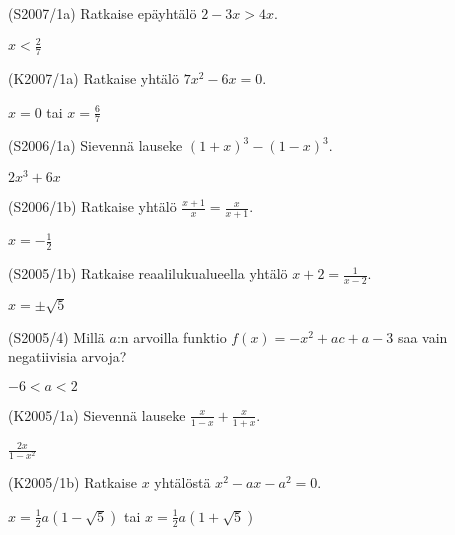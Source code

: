 \begin{tehtava}
(S2007/1a) Ratkaise epäyhtälö $2-3x>4x$.
\begin{vastaus}
$x< \frac{2}{7} $
\end{vastaus}
\end{tehtava}

\begin{tehtava}
(K2007/1a) Ratkaise yhtälö $7x^2-6x=0$.
\begin{vastaus}
$x=0$ tai $x=\frac{6}{7}$
\end{vastaus}
\end{tehtava}

\begin{tehtava}
(S2006/1a) Sievennä lauseke $(1+x)^3-(1-x)^3$.
\begin{vastaus}
$2x^3+6x$ 
\end{vastaus}
\end{tehtava}

\begin{tehtava}
(S2006/1b) Ratkaise yhtälö $ \frac{x+1}{x}=\frac{x}{x+1}$.
\begin{vastaus}
$x=-\frac{1}{2}$ 
\end{vastaus}
\end{tehtava}

\begin{tehtava}
(S2005/1b) Ratkaise reaalilukualueella yhtälö $x+2=\frac{1}{x-2}$.
\begin{vastaus}
$x=\pm \sqrt{5}$ 
\end{vastaus}
\end{tehtava}

\begin{tehtava}
(S2005/4) Millä $a$:n arvoilla funktio $f(x)=-x^2+ac+a-3$ saa vain negatiivisia arvoja?
\begin{vastaus}
$-6<a<2$ 
\end{vastaus}
\end{tehtava}

\begin{tehtava}
(K2005/1a) Sievennä lauseke $\frac{x}{1-x}+\frac{x}{1+x}$.
\begin{vastaus}
$\frac{2x}{1-x^2}$ 
\end{vastaus}
\end{tehtava}

\begin{tehtava}
(K2005/1b) Ratkaise $x$ yhtälöstä $x^2-ax-a^2=0$.
\begin{vastaus}
$x= \frac{1}{2}a(1-\sqrt{5})$ tai $x= \frac{1}{2}a(1+\sqrt{5})$ 
\end{vastaus}
\end{tehtava}

